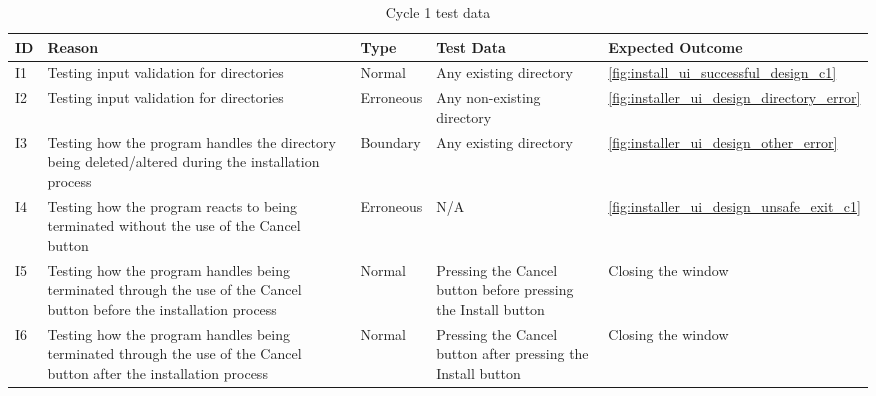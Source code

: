 \documentclass[11pt]{article}
\begin{document}
        \newpage
        \begin{table}[!h]
            \centering
            \begin{tabular}{@{}lp{150pt}lp{87pt}l@{}} \toprule
                \textbf{ID} & \textbf{Reason} & \textbf{Type} & \textbf{Test Data} & \textbf{Expected Outcome} \\ \midrule
                I1 & Testing input validation for directories & Normal & Any existing directory & \autoref{fig:install_ui_successful_design_c1} \\ 
                I2 & Testing input validation for directories & Erroneous & Any non-existing directory & \autoref{fig:installer_ui_design_directory_error} \\ 
                I3 & Testing how the program handles the directory being deleted/altered during the installation process & Boundary & Any existing directory & \autoref{fig:installer_ui_design_other_error} \\ 
                I4 & Testing how the program reacts to being terminated without the use of the Cancel button & Erroneous & N/A & \autoref{fig:installer_ui_design_unsafe_exit_c1} \\ 
                I5 & Testing how the program handles being terminated through the use of the Cancel button before the installation process & Normal & Pressing the Cancel button before pressing the Install button & Closing the window \\ 
                I6 & Testing how the program handles being terminated through the use of the Cancel button after the installation process & Normal & Pressing the Cancel button after pressing the Install button & Closing the window \\
                \bottomrule
            \end{tabular}
            \caption{Cycle 1 test data}
            \label{tbl:test_data_before_c1}
        \end{table}
\end{document}
